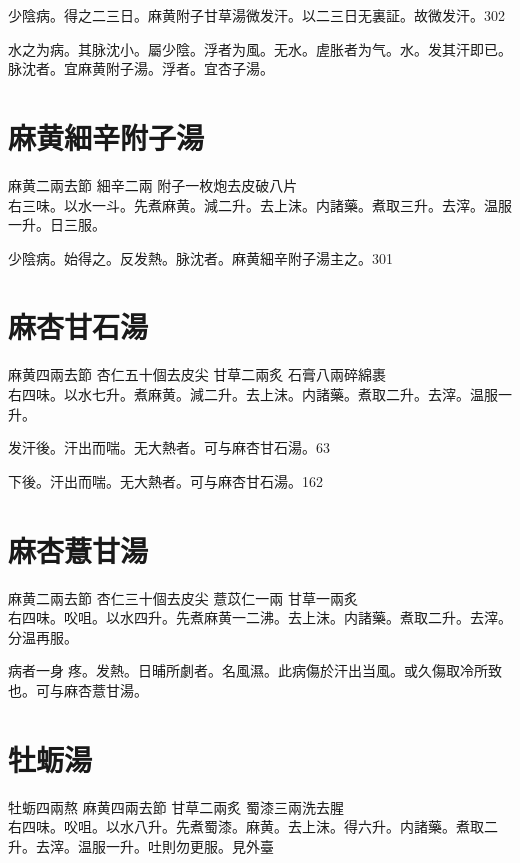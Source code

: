 少陰病。得之二三日。麻黄附子甘草湯微发汗。以二三日无{\khaaitp 裏}証。故微发汗。302

水之为病。其脉沈小。屬少陰。浮者为風。无水。虗胀者为气。水。发其汗即已。脉沈者。宜麻黄附子湯。浮者。宜杏子湯。

\section{麻黄細辛附子湯}

麻黄{\scriptsize 二兩去節} 細辛{\scriptsize 二兩} 附子{\scriptsize 一枚炮去皮破八片}\\
右三味。以水一斗。先煮麻黄。減二升。去上沫。内諸藥。煮取三升。去滓。温服一升。日三服。

少陰病。始得之。反发熱。脉沈者。麻黄細辛附子湯主之。301

\section{麻杏甘石湯}

麻黄{\scriptsize 四兩去節} 杏仁{\scriptsize 五十個去皮尖} 甘草{\scriptsize 二兩炙} 石膏{\scriptsize 八兩碎綿裹}\\
右四味。以水七升。煮麻黄。減二升。去上沫。内諸藥。煮取二升。去滓。温服一升。

发汗後。汗出而喘。无大熱者。可与麻杏甘石湯。63

下後。汗出而喘。无大熱者。可与麻杏甘石湯。162

\section{麻杏薏甘湯}

麻黄{\scriptsize 二兩去節} 杏仁{\scriptsize 三十個去皮尖} 薏苡仁{\scriptsize 一兩} 甘草{\scriptsize 一兩炙}\\
右四味。㕮咀。以水四升。先煮麻黄一二沸。去上沫。内諸藥。煮取二升。去滓。分温再服。

病者一身{\sungtpii 𥁞}疼。发熱。日晡所劇者。名風濕。此病傷於汗出当風。或久傷取冷所致也。可与麻杏薏甘湯。

\section{牡蛎湯}

牡蛎{\scriptsize 四兩熬} 麻黄{\scriptsize 四兩去節} 甘草{\scriptsize 二兩炙} 蜀漆{\scriptsize 三兩洗去腥}\\
右四味。㕮咀。以水八升。先煮蜀漆。麻黄。去上沫。得六升。内諸藥。煮取二升。去滓。温服一升。吐則勿更服。{\scriptsize 見外臺}

